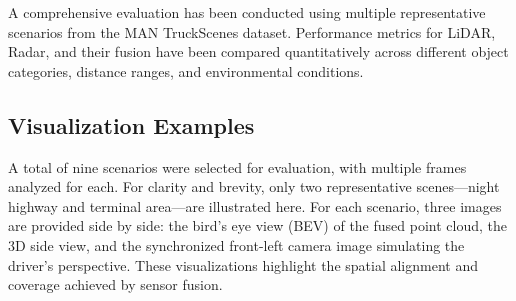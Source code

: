 \documentclass[10pt, a4paper, oneside]{article}
\begin{document}
A comprehensive evaluation has been conducted using multiple representative scenarios from the MAN TruckScenes dataset. Performance metrics for LiDAR, Radar, and their fusion have been compared quantitatively across different object categories, distance ranges, and environmental conditions.

\begin{small}
\end{small}

\subsection{Visualization Examples}

A total of nine scenarios were selected for evaluation, with multiple frames analyzed for each. For clarity and brevity, only two representative scenes—night highway and terminal area—are illustrated here. For each scenario, three images are provided side by side: the bird’s eye view (BEV) of the fused point cloud, the 3D side view, and the synchronized front-left camera image simulating the driver’s perspective. These visualizations highlight the spatial alignment and coverage achieved by sensor fusion.
\end{document}
